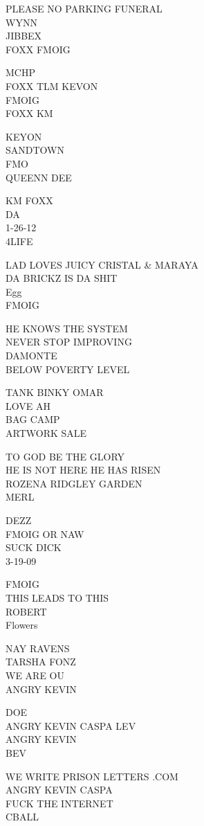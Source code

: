 \documentclass[10pt,letterpaper]{article}
\begin{document}
PLEASE NO PARKING FUNERAL\\
WYNN\\
JIBBEX\\
FOXX FMOIG

MCHP\\
FOXX TLM KEVON\\
FMOIG\\
FOXX KM

KEYON\\
SANDTOWN\\
FMO\\
QUEENN DEE

KM FOXX\\
DA\\
1{-}26{-}12\\
4LIFE

LAD LOVES JUICY CRISTAL \& MARAYA\\
DA BRICKZ IS DA SHIT\\
Egg\\
FMOIG

HE KNOWS THE SYSTEM\\
NEVER STOP IMPROVING\\
DAMONTE\\
BELOW POVERTY LEVEL

TANK BINKY OMAR\\
LOVE AH\\
BAG CAMP\\
ARTWORK SALE

TO GOD BE THE GLORY\\
HE IS NOT HERE HE HAS RISEN\\
ROZENA RIDGLEY GARDEN\\
MERL

DEZZ\\
FMOIG OR NAW\\
SUCK DICK\\
3{-}19{-}09

FMOIG\\
THIS LEADS TO THIS\\
ROBERT\\
Flowers

NAY RAVENS\\
TARSHA FONZ\\
WE ARE OU\\
ANGRY KEVIN

DOE\\
ANGRY KEVIN CASPA LEV\\
ANGRY KEVIN\\
BEV

WE WRITE PRISON LETTERS .COM\\
ANGRY KEVIN CASPA\\
FUCK THE INTERNET\\
CBALL
\end{document}
